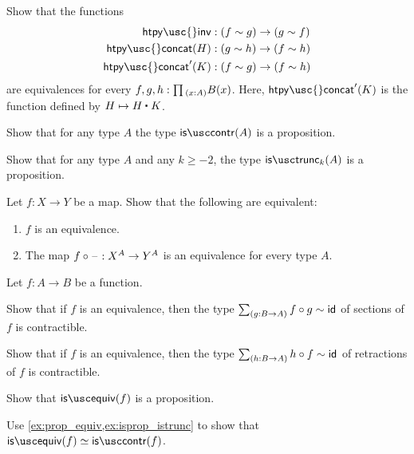 \begin{exercises}
\item Show that the functions
\begin{align*}
\mathsf{htpy\usc{}inv} & : (f \htpy g) \to (g \htpy f) \\
\mathsf{htpy\usc{}concat}(H) & : (g \htpy h) \to (f \htpy h) \\
\mathsf{htpy\usc{}concat}'(K) & : (f \htpy g) \to (f \htpy h)
\end{align*}
are equivalences for every $f,g,h : \prd{x:A}B(x)$. Here, $\mathsf{htpy\usc{}concat}'(K)$ is the function defined by $H\mapsto \ct{H}{K}$.
\item \label{ex:isprop_istrunc}
\begin{subexenum}
\item Show that for any type $A$ the type $\iscontr(A)$ is a proposition. %
\item Show that for any type $A$ and any $k\geq-2$, the type $\istrunc{k}(A)$ is a proposition.
\end{subexenum}
\item \label{lem:postcomp_equiv}
Let $f:X\to Y$ be a map. Show that the following are equivalent:
\begin{enumerate}
\item $f$ is an equivalence.
\item The map $f\circ\mathord{\hspace{1pt}\text{--}\hspace{1pt}} : X^A\to Y^A$ is an equivalence for every type $A$.
\end{enumerate}
\item \label{ex:isprop_isequiv}Let $f:A\to B$ be a function.
\begin{subexenum}
\item Show that if $f$ is an equivalence, then the type $\sm{g:B\to A}f\circ g\htpy \idfunc$ of sections of $f$ is contractible.
\item Show that if $f$ is an equivalence, then the type $\sm{h:B\to A}h\circ f\htpy \idfunc$ of retractions of $f$ is contractible.
\item Show that $\isequiv(f)$ is a proposition.
\item Use \cref{ex:prop_equiv,ex:isprop_istrunc} to show that $\isequiv(f)\eqvsym \iscontr(f)$.

\end{subexenum}
\end{exercises}
